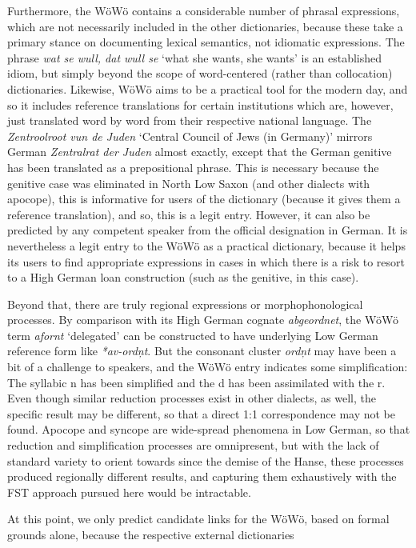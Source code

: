 \documentclass{article}
\newcommand{\word}[1]{\textsl{#1}}
\begin{document}
Furthermore, the WöWö contains a considerable number of phrasal expressions, which are not necessarily included in the other dictionaries, because these take a primary stance on documenting lexical semantics, not idiomatic expressions. The phrase \word{wat se wull, dat wull se} `what she wants, she wants' is an established idiom, but simply beyond the scope of word-centered (rather than collocation) dictionaries. Likewise, WöWö aims to be a practical tool for the modern day, and so it includes reference translations for certain institutions which are, however, just translated word by word from their respective national language. The \word{Zentroolroot vun de Juden} `Central Council of Jews (in Germany)' mirrors German \word{Zentralrat der Juden} almost exactly, except that the German genitive has been translated as a prepositional phrase. This is necessary because the genitive case was eliminated in North Low Saxon (and other dialects with apocope), this is informative for users of the dictionary (because it gives them a reference translation), and so, this is a legit entry. However, it can also be predicted by any competent speaker from the official designation in German. It is nevertheless a legit entry to the WöWö as a practical dictionary, because it helps its users to find appropriate expressions in cases in which there is a risk to resort to a High German loan construction (such as the genitive, in this case).

Beyond that, there are truly regional expressions or morphophonological processes. By comparison with its High German cognate \word{abgeordnet}, the WöWö term \word{afornt} `delegated' can be constructed to have underlying Low German reference form like \word{*av-ordņt}. But the consonant cluster \word{ordņt} may have been a bit of a challenge to speakers, and the WöWö entry indicates some simplification: The syllabic n has been simplified and the d has been assimilated with the r. Even though similar reduction processes exist in other dialects, as well, the specific result may be different, so that a direct 1:1 correspondence may not be found. Apocope and syncope are wide-spread phenomena in Low German, so that reduction and simplification processes are omnipresent, but with the lack of standard variety to orient towards since the demise of the Hanse, these processes produced regionally different results, and capturing them exhaustively with the FST approach pursued here would be intractable.

At this point, we only predict candidate links for the WöWö, based on formal grounds alone, because the respective external dictionaries 
\end{document}
